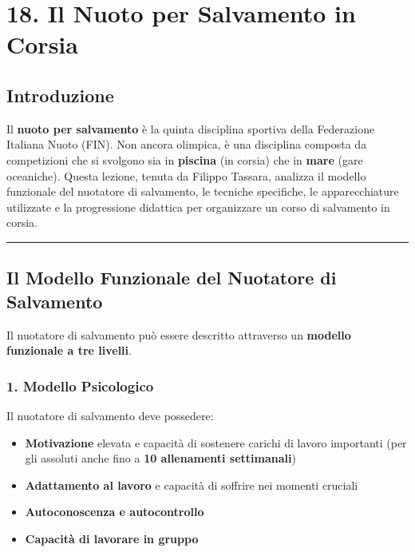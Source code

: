 \documentclass[a4paper,11pt]{article}
\providecommand{\tightlist}{%
  \setlength{\itemsep}{0pt}\setlength{\parskip}{0pt}}
\begin{document}
\section{18. Il Nuoto per Salvamento in
  Corsia}\label{il-nuoto-per-salvamento-in-corsia}

\subsection{Introduzione}\label{introduzione-17}

Il \textbf{nuoto per salvamento} è la quinta disciplina sportiva della
Federazione Italiana Nuoto (FIN). Non ancora olimpica, è una disciplina
composta da competizioni che si svolgono sia in \textbf{piscina} (in
corsia) che in \textbf{mare} (gare oceaniche). Questa lezione, tenuta da
Filippo Tassara, analizza il modello funzionale del nuotatore di
salvamento, le tecniche specifiche, le apparecchiature utilizzate e la
progressione didattica per organizzare un corso di salvamento in corsia.

\begin{center}\rule{0.5\linewidth}{0.5pt}\end{center}

\subsection{Il Modello Funzionale del Nuotatore di
      Salvamento}\label{il-modello-funzionale-del-nuotatore-di-salvamento}

Il nuotatore di salvamento può essere descritto attraverso un
\textbf{modello funzionale a tre livelli}.

\subsubsection{1. Modello Psicologico}\label{modello-psicologico}

Il nuotatore di salvamento deve possedere:

\begin{itemize}
      \tightlist
      \item
            \textbf{Motivazione} elevata e capacità di sostenere carichi di lavoro
            importanti (per gli assoluti anche fino a \textbf{10 allenamenti
                  settimanali})
      \item
            \textbf{Adattamento al lavoro} e capacità di soffrire nei momenti
            cruciali
      \item
            \textbf{Autoconoscenza e autocontrollo}
      \item
            \textbf{Capacità di lavorare in gruppo}
\end{itemize}
\end{document}
